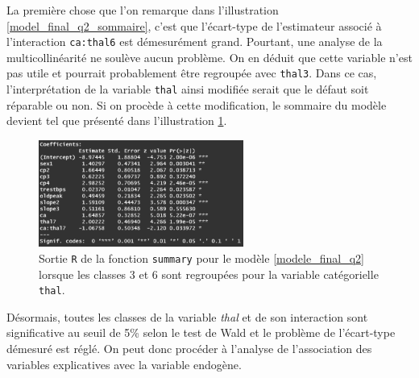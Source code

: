\documentclass{article}
\begin{document}
	La première chose que l'on remarque dans l'illustration \ref{model_final_q2_sommaire}, c'est que l'écart-type de l'estimateur associé à l'interaction \texttt{ca:thal6} est démesurément grand. Pourtant, une analyse de la multicollinéarité ne soulève aucun problème. On en déduit que cette variable n'est pas utile et pourrait probablement être regroupée avec \texttt{thal3}. Dans ce cas, l'interprétation de la variable \texttt{thal} ainsi modifiée serait que le défaut soit réparable ou non.
	Si on procède à cette modification, le sommaire du modèle devient tel que présenté dans l'illustration \ref{model_final_q2_sommaire_2}.
	\begin{figure}[H]
		\centering
		\includegraphics[width=0.6\textwidth]{graphiques/model_final_q2_sommaire_2}
		\caption{Sortie \texttt{R} de la fonction \texttt{summary} pour le modèle \eqref{modele_final_q2} lorsque les classes 3 et 6 sont regroupées pour la variable catégorielle \texttt{thal}.}
		\label{model_final_q2_sommaire_2}
	\end{figure}
	Désormais, toutes les classes de la variable \textit{thal} et de son interaction sont significative au seuil de 5\% selon le test de Wald et le problème de l'écart-type démesuré est réglé. On peut donc procéder à l'analyse de l'association des variables explicatives avec la variable endogène.\\
\end{document}

